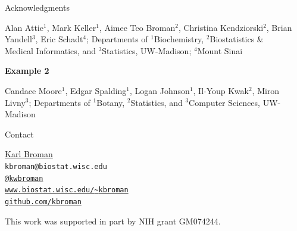 \documentclass[final,plain]{beamer}
\newlength{\sepwid}
\newlength{\onecolwid}
\newcommand{\bluebold}{\color{dblue} \bf}
\newcommand{\coltwovsep}{\vspace{40mm}}
\begin{document}
\begin{frame}[t]
\begin{columns}[t]
\begin{column}{\onecolwid}
\begin{block}{Acknowledgments}
          \vspace{12pt}
          \hfill \begin{minipage}{0.165\paperwidth} Alan Attie$^1$,
            Mark Keller$^1$, Aimee Teo Broman$^2$, Christina
            Kendziorski$^2$, Brian Yandell$^3$, Eric Schadt$^4$;
            Departments of $^1$Biochemistry, $^2$Biostatistics \&
            Medical Informatics, and $^3$Statistics, UW-Madison;
            $^4$Mount Sinai
          \end{minipage}

          \vspace{24pt}

      {\bluebold Example 2}

          \vspace{12pt}
          \hfill \begin{minipage}{0.165\paperwidth} 
            Candace Moore$^1$, Edgar Spalding$^1$, Logan Johnson$^1$, Il-Youp Kwak$^2$,
            Miron Livny$^3$; Departments of $^1$Botany,
            $^2$Statistics, and $^3$Computer Sciences, UW-Madison
          \end{minipage}

    \end{block}

  \coltwovsep %

    \begin{block}{Contact}
      \hspace{5em}
        \begin{minipage}{22em}
        \href{http://www.biostat.wisc.edu/~kbroman}{Karl Broman}\\
        {\tt kbroman@biostat.wisc.edu}\\
        \href{http://twitter.com/kwbroman}{\tt @kwbroman} \\
        \href{http://www.biostat.wisc.edu/~kbroman}{\tt www.biostat.wisc.edu/{\textasciitilde}kbroman} \\
        \href{http://github.com/kbroman}{\tt github.com/kbroman}
        \end{minipage}

    \vspace{60pt}
    {\rmfamily \footnotesize
    \centerline{This work was supported in part by NIH grant GM074244.}}
    \end{block}

  \end{column}

\begin{column}{\sepwid} \end{column}                 %


\end{columns}
\end{frame}
\end{document}
